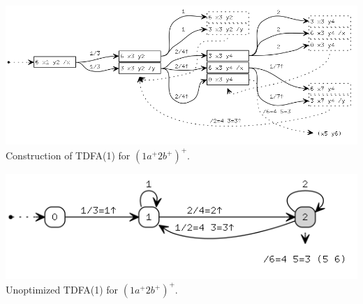 \documentclass{article}
\theoremstyle{definition}
\begin{document}
\begin{multicols}{2}
\begin{center}
\end{center}
\begin{center}
\includegraphics[width=\linewidth]{img/example5/tdfa1_raw.png}\\
\footnotesize{Construction of TDFA(1) for $(1 a^+ 2 b^+)^+$.} \\
\end{center}
\begin{center}
\includegraphics[width=0.8\linewidth]{img/example5/tdfa1.png}\\
\footnotesize{Unoptimized TDFA(1) for $(1 a^+ 2 b^+)^+$.} \\
\end{center}


\end{multicols}
\end{document}
